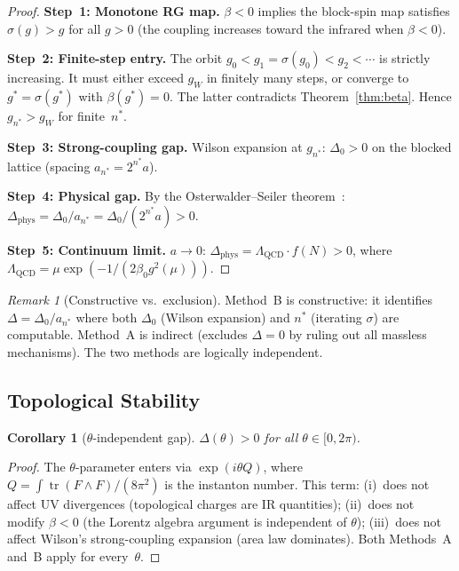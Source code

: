 \documentclass[12pt,a4paper]{article}
\theoremstyle{plain}
\newtheorem{corollary}[theorem]{Corollary}
\theoremstyle{definition}
\theoremstyle{remark}
\newtheorem{remark}[theorem]{Remark}
\begin{document}
\begin{proof}
\textbf{Step~1: Monotone RG map.} $\beta<0$ implies the block-spin map satisfies $\sigma(g)>g$ for all $g>0$ (the coupling increases toward the infrared when $\beta<0$).

\textbf{Step~2: Finite-step entry.} The orbit $g_0<g_1=\sigma(g_0)<g_2<\cdots$ is strictly increasing. It must either exceed $g_W$ in finitely many steps, or converge to $g^*=\sigma(g^*)$ with $\beta(g^*)=0$. The latter contradicts Theorem~\ref{thm:beta}. Hence $g_{n^*}>g_W$ for finite~$n^*$.

\textbf{Step~3: Strong-coupling gap.} Wilson expansion at $g_{n^*}$: $\Delta_0>0$ on the blocked lattice (spacing $a_{n^*}=2^{n^*}a$).

\textbf{Step~4: Physical gap.} By the Osterwalder--Seiler theorem~\cite{OsterwalderSeiler1978}:
$\Delta_{\mathrm{phys}}=\Delta_0/a_{n^*}=\Delta_0/(2^{n^*}a)>0$.

\textbf{Step~5: Continuum limit.} $a\to 0$: $\Delta_{\mathrm{phys}}=\Lambda_{\mathrm{QCD}}\cdot f(N)>0$, where $\Lambda_{\mathrm{QCD}}=\mu\exp(-1/(2\beta_0 g^2(\mu)))$.
\end{proof}

\begin{remark}[Constructive vs.\ exclusion]
Method~B is constructive: it identifies $\Delta=\Delta_0/a_{n^*}$ where both $\Delta_0$ (Wilson expansion) and $n^*$ (iterating $\sigma$) are computable. Method~A is indirect (excludes $\Delta=0$ by ruling out all massless mechanisms). The two methods are logically independent.
\end{remark}

\subsection{Topological Stability}\label{sec:theta}

\begin{corollary}[$\theta$-independent gap]\label{cor:theta}
$\Delta(\theta)>0$ for all $\theta\in[0,2\pi)$.
\end{corollary}

\begin{proof}
The $\theta$-parameter enters via $\exp(i\theta Q)$, where $Q=\int\operatorname{tr}(F\wedge F)/(8\pi^2)$ is the instanton number. This term: (i)~does not affect UV divergences (topological charges are IR quantities); (ii)~does not modify $\beta<0$ (the Lorentz algebra argument is independent of $\theta$); (iii)~does not affect Wilson's strong-coupling expansion (area law dominates). Both Methods~A and~B apply for every~$\theta$.
\end{proof}
\end{document}
